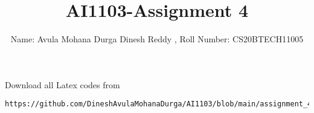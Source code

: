 \documentclass[journal,12pt,twocolumn]{IEEEtran}
\DeclareMathOperator*{\Res}{Res}
\begin{document}
\newcommand{\BEQA}{\begin{eqnarray}}
\newcommand{\EEQA}{\end{eqnarray}}
\newcommand{\define}{\stackrel{\triangle}{=}}

\raggedbottom
\setlength{\parindent}{0pt}
\providecommand{\mbf}{\mathbf}
\providecommand{\pr}[1]{\ensuremath{\Pr\left(#1\right)}}
\providecommand{\qfunc}[1]{\ensuremath{Q\left(#1\right)}}
\providecommand{\sbrak}[1]{\ensuremath{{}\left[#1\right]}}
\providecommand{\lsbrak}[1]{\ensuremath{{}\left[#1\right.}}
\providecommand{\rsbrak}[1]{\ensuremath{{}\left.#1\right]}}
\providecommand{\brak}[1]{\ensuremath{\left(#1\right)}}
\providecommand{\lbrak}[1]{\ensuremath{\left(#1\right.}}
\providecommand{\rbrak}[1]{\ensuremath{\left.#1\right)}}
\providecommand{\cbrak}[1]{\ensuremath{\left\{#1\right\}}}
\providecommand{\lcbrak}[1]{\ensuremath{\left\{#1\right.}}
\providecommand{\rcbrak}[1]{\ensuremath{\left.#1\right\}}}
\theoremstyle{remark}
\newtheorem{rem}{Remark}
\newcommand{\sgn}{\mathop{\mathrm{sgn}}}
\providecommand{\abs}[1]{\vert#1\vert}
\providecommand{\res}[1]{\Res\displaylimits_{#1}} 
\providecommand{\norm}[1]{\lVert#1\rVert}
\providecommand{\mtx}[1]{\mathbf{#1}}
\providecommand{\mean}[1]{E[ #1 ]}
\providecommand{\fourier}{\overset{\mathcal{F}}{ \rightleftharpoons}}
\providecommand{\system}{\overset{\mathcal{H}}{ \longleftrightarrow}}
\newcommand{\solution}{\noindent \textbf{Solution: }}
\newcommand{\cosec}{\,\text{cosec}\,}
\providecommand{\dec}[2]{\ensuremath{\overset{#1}{\underset{#2}{\gtrless}}}}
\newcommand{\myvec}[1]{\ensuremath{\begin{pmatrix}#1\end{pmatrix}}}
\newcommand{\mydet}[1]{\ensuremath{\begin{vmatrix}#1\end{vmatrix}}}
\makeatletter
{}
\makeatother
\let\StandardTheFigure\thefigure
\let\vec\mathbf
\renewcommand{\thefigure}{\theproblem}
\def\putbox#1#2#3{\makebox[0in][l]{\makebox[#1][l]{}\raisebox{\baselineskip}[0in][0in]{\raisebox{#2}[0in][0in]{#3}}}}
     \def\rightbox#1{\makebox[0in][r]{#1}}
     \def\centbox#1{\makebox[0in]{#1}}
     \def\topbox#1{\raisebox{-\baselineskip}[0in][0in]{#1}}
     \def\midbox#1{\raisebox{-0.5\baselineskip}[0in][0in]{#1}}
\vspace{3cm}
\title{AI1103-Assignment 4}
\author{Name: Avula Mohana Durga Dinesh Reddy , Roll Number: CS20BTECH11005}
\maketitle
\newpage
\bigskip
\renewcommand{\thefigure}{\theenumi}
\renewcommand{\thetable}{\theenumi}
Download all Latex codes from 
%
\begin{lstlisting}
https://github.com/DineshAvulaMohanaDurga/AI1103/blob/main/assignment_4/main.tex
\end{lstlisting}
\end{document}
